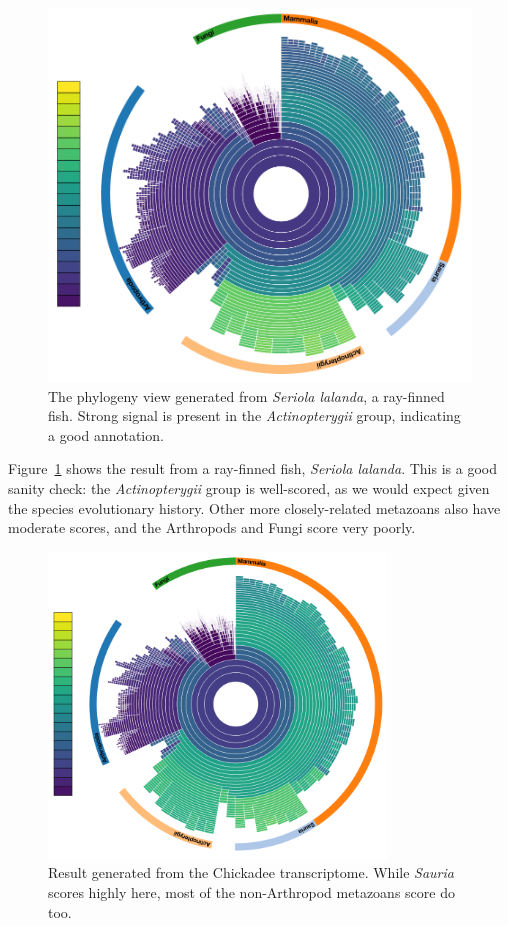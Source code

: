 \documentclass[12pt]{article} %
\begin{document}
\begin{figure}[!ht]
  \caption{The phylogeny view generated from \textit{Seriola lalanda}, a ray-finned fish. Strong signal is present in the
  				 \textit{Actinopterygii} group, indicating a good annotation.}\label{fig:seriola}
  \centering
    \includegraphics[width=.8\textwidth]{Seriola_lalandi}
\end{figure}

Figure~\ref{fig:seriola} shows the result from a ray-finned fish,  \textit{Seriola lalanda}. This is a good sanity check: the \textit{Actinopterygii} 
group is well-scored, as we would expect given the species evolutionary history. Other more closely-related metazoans also have
moderate scores, and the Arthropods and Fungi score very poorly.

\begin{figure}[!ht]

  \caption{Result generated from the Chickadee transcriptome. While \textit{Sauria} scores highly here, most of the non-Arthropod
  				 metazoans score do too.}\label{fig:chick}
  \centering
    \includegraphics[width=0.8\textwidth]{Chickadee}
\end{figure}
\end{document}
